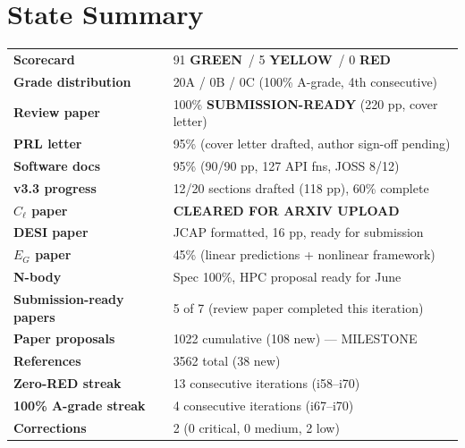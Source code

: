 \documentclass[11pt,a4paper]{article}
\newcommand{\GREEN}{\textcolor{dfdgreen}{\textbf{GREEN}}}
\newcommand{\YELLOW}{\textcolor{dfdyellow}{\textbf{YELLOW}}}
\newcommand{\RED}{\textcolor{dfdred}{\textbf{RED}}}
\begin{document}
\section{State Summary}

\begin{tcolorbox}[colback=green!5,colframe=dfdgreen,title=i70 State]
\begin{center}
\begin{tabular}{ll}
\textbf{Scorecard} & 91 \GREEN\ / 5 \YELLOW\ / 0 \RED \\
\textbf{Grade distribution} & 20A / 0B / 0C (100\% A-grade, 4th consecutive) \\
\textbf{Review paper} & 100\% \textbf{SUBMISSION-READY} (220 pp, cover letter) \\
\textbf{PRL letter} & 95\% (cover letter drafted, author sign-off pending) \\
\textbf{Software docs} & 95\% (90/90 pp, 127 API fns, JOSS 8/12) \\
\textbf{v3.3 progress} & 12/20 sections drafted (118 pp), 60\% complete \\
\textbf{$C_\ell$ paper} & \textbf{CLEARED FOR ARXIV UPLOAD} \\
\textbf{DESI paper} & JCAP formatted, 16 pp, ready for submission \\
\textbf{$E_G$ paper} & 45\% (linear predictions + nonlinear framework) \\
\textbf{N-body} & Spec 100\%, HPC proposal ready for June \\
\textbf{Submission-ready papers} & 5 of 7 (review paper completed this iteration) \\
\textbf{Paper proposals} & 1022 cumulative (108 new) --- MILESTONE \\
\textbf{References} & 3562 total (38 new) \\
\textbf{Zero-RED streak} & 13 consecutive iterations (i58--i70) \\
\textbf{100\% A-grade streak} & 4 consecutive iterations (i67--i70) \\
\textbf{Corrections} & 2 (0 critical, 0 medium, 2 low) \\
\end{tabular}
\end{center}
\end{tcolorbox}
\end{document}
